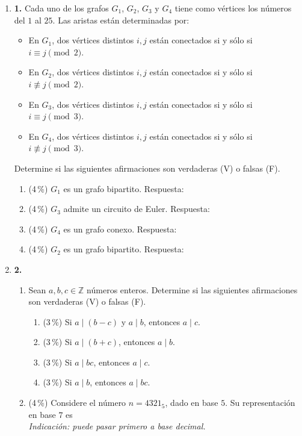 \documentclass[11pt]{article}
\newcommand{\resp}{\underline{\hspace{3cm}}}
\newcommand{\vf}{\underline{\hspace{1.2cm}}}
\begin{document}
\begin{enumerate}
\item[]\textbf{1.} Cada uno de los grafos $G_1$, $G_2$, $G_3$ y $G_4$ tiene como vértices los números del $1$ al $25$. Las aristas están determinadas por:
\begin{itemize}
\item En $G_1$, dos vértices distintos $i, j$ están conectados si y sólo si $i \equiv j \pmod 2$.
\item En $G_2$, dos vértices distintos $i, j$ están conectados si y sólo si $i \not\equiv j \pmod 2$.
\item En $G_3$, dos vértices distintos $i, j$ están conectados si y sólo si $i \equiv j \pmod 3$.
\item En $G_4$, dos vértices distintos $i, j$ están conectados si y sólo si $i \not\equiv j \pmod 3$.
\end{itemize}
Determine si las siguientes afirmaciones son verdaderas (V) o falsas (F).
\begin{enumerate}[label=(\alph*)]
\item (4\,\%) $G_1$ es un grafo bipartito. \hfill Respuesta: \vf
\item (4\,\%) $G_3$ admite un circuito de Euler. \hfill Respuesta: \vf
\item (4\,\%) $G_4$ es un grafo conexo. \hfill Respuesta: \vf
\item (4\,\%) $G_2$ es un grafo bipartito. \hfill Respuesta: \vf
\end{enumerate}

\item[]\textbf{2.}
\begin{enumerate}[label=(\alph*)]
\item Sean $a, b, c \in \mathbb{Z}$ números enteros. Determine si las siguientes afirmaciones son verdaderas (V) o falsas (F).
\begin{enumerate}[label=\roman*.]
\item (3\,\%) Si $a \mid (b - c)$ y $a \mid b$, entonces $a \mid c$. \hfill \vf
\item (3\,\%) Si $a \mid (b + c)$, entonces $a \mid b$. \hfill \vf
\item (3\,\%) Si $a \mid bc$, entonces $a \mid c$. \hfill \vf
\item (3\,\%) Si $a \mid b$, entonces $a \mid bc$. \hfill \vf
\end{enumerate}
\item (4\,\%) Considere el número $n = 4321_5$, dado en base $5$. Su representación en base $7$ es \resp \\ \emph{Indicación: puede pasar primero a base decimal.}
\end{enumerate}


\end{enumerate}
\end{document}
